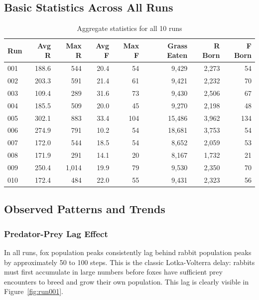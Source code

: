 \documentclass[12pt]{article}
\begin{document}
\subsection{Basic Statistics Across All Runs}

\begin{table}[H]
\centering
\caption{Aggregate statistics for all 10 runs}
\small
\begin{tabular}{lrrrrrrr}
\toprule
\textbf{Run} & \textbf{Avg R} & \textbf{Max R} & \textbf{Avg F} &
\textbf{Max F} & \textbf{Grass Eaten} & \textbf{R Born} & \textbf{F Born} \\
\midrule
001 & 188.6 & 544   & 20.4 & 54  & 9,429  & 2,273 & 54  \\
002 & 203.3 & 591   & 21.4 & 61  & 9,421  & 2,232 & 70  \\
003 & 109.4 & 289   & 31.6 & 73  & 9,430  & 2,506 & 67  \\
004 & 185.5 & 509   & 20.0 & 45  & 9,270  & 2,198 & 48  \\
005 & 302.1 & 883   & 33.4 & 104 & 15,486 & 3,962 & 134 \\
006 & 274.9 & 791   & 10.2 & 54  & 18,681 & 3,753 & 54  \\
007 & 172.0 & 544   & 18.5 & 54  & 8,652  & 2,059 & 53  \\
008 & 171.9 & 291   & 14.1 & 20  & 8,167  & 1,732 & 21  \\
009 & 250.4 & 1,014 & 19.9 & 79  & 9,530  & 2,350 & 70  \\
010 & 172.4 & 484   & 22.0 & 55  & 9,431  & 2,323 & 56  \\
\bottomrule
\end{tabular}
\end{table}

\subsection{Observed Patterns and Trends}

\subsubsection{Predator-Prey Lag Effect}

In all runs, fox population peaks consistently lag behind rabbit population
peaks by approximately 50 to 100 steps. This is the classic Lotka-Volterra
delay: rabbits must first accumulate in large numbers before foxes have
sufficient prey encounters to breed and grow their own population. This lag
is clearly visible in Figure~\ref{fig:run001}.
\end{document}
